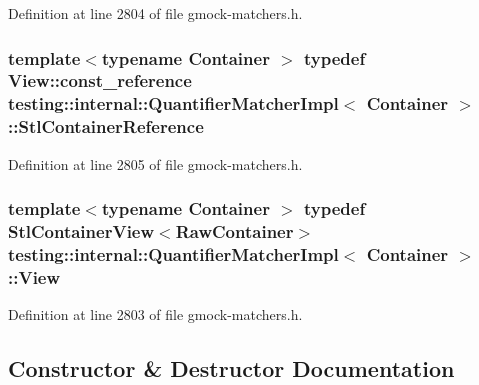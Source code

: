 Definition at line 2804 of file gmock-\/matchers.\+h.

\subsubsection[{\texorpdfstring{Stl\+Container\+Reference}{StlContainerReference}}]{\setlength{\rightskip}{0pt plus 5cm}template$<$typename Container $>$ typedef {\bf View\+::const\+\_\+reference} {\bf testing\+::internal\+::\+Quantifier\+Matcher\+Impl}$<$ Container $>$\+::{\bf Stl\+Container\+Reference}}\hypertarget{classtesting_1_1internal_1_1_quantifier_matcher_impl_a341dd7815b3c6090d935026daac6e938}{}\label{classtesting_1_1internal_1_1_quantifier_matcher_impl_a341dd7815b3c6090d935026daac6e938}


Definition at line 2805 of file gmock-\/matchers.\+h.

\subsubsection[{\texorpdfstring{View}{View}}]{\setlength{\rightskip}{0pt plus 5cm}template$<$typename Container $>$ typedef {\bf Stl\+Container\+View}$<$Raw\+Container$>$ {\bf testing\+::internal\+::\+Quantifier\+Matcher\+Impl}$<$ Container $>$\+::{\bf View}}\hypertarget{classtesting_1_1internal_1_1_quantifier_matcher_impl_aa1e6b1653b6fdee1b0cfc4c58a9059e6}{}\label{classtesting_1_1internal_1_1_quantifier_matcher_impl_aa1e6b1653b6fdee1b0cfc4c58a9059e6}


Definition at line 2803 of file gmock-\/matchers.\+h.



\subsection{Constructor \& Destructor Documentation}
